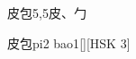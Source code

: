 \begin{entry}{皮包}{5,5}{⽪、⼓}
  \begin{phonetics}{皮包}{pi2 bao1}[][HSK 3]
  \end{phonetics}
\end{entry}
